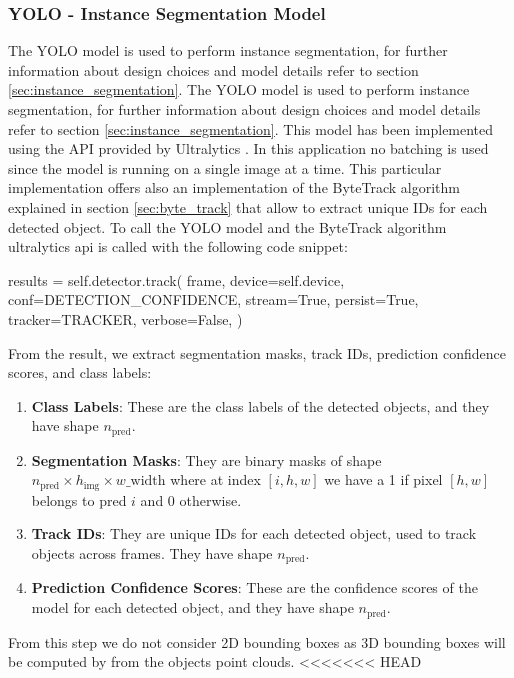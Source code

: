 \subsubsection[YOLO]{YOLO - Instance Segmentation Model}
The YOLO model is used to perform instance segmentation, for further information about 
design choices and model details refer to section \ref{sec:instance_segmentation}.
The YOLO model is used to perform instance segmentation, for further information about 
design choices and model details refer to section \ref{sec:instance_segmentation}.
This model has been implemented using the API provided by Ultralytics \cite{ultralytics_yolo_2023}.
In this application no batching is used since the model is running on a single image at a time.
This particular implementation offers also an implementation of the ByteTrack algorithm explained in section 
\ref{sec:byte_track} that allow to extract unique IDs for each detected object.
To call the YOLO model and the ByteTrack algorithm ultralytics api is called with the following code snippet:
\begin{python}
results = self.detector.track(
                frame,
                device=self.device,
                conf=DETECTION_CONFIDENCE,
                stream=True,
                persist=True,
                tracker=TRACKER,
                verbose=False,
            )
\end{python}
From the result, we extract segmentation masks, track IDs, prediction confidence scores, and class labels:
\begin{enumerate}
    \item \textbf{Class Labels}: These are the class labels of the detected objects, and they have shape \( n_{\text{pred}} \).
    \item \textbf{Segmentation Masks}: They are binary masks of shape \( n_{\text{pred}} \times h_{\text{img}} \times w\_{\text{width}} \) where at index \( [i, h, w] \) we have a 1 if pixel \( [h, w] \) belongs to pred \( i \) and 0 otherwise.
    \item \textbf{Track IDs}: They are unique IDs for each detected object, used to track objects across frames. They have shape \( n_{\text{pred}} \).
    \item \textbf{Prediction Confidence Scores}: These are the confidence scores of the model for each detected object, and they have shape \( n_{\text{pred}} \).
\end{enumerate}
From this step we do not consider 2D bounding boxes as 3D bounding boxes will be computed by from the objects point clouds.
<<<<<<< HEAD

